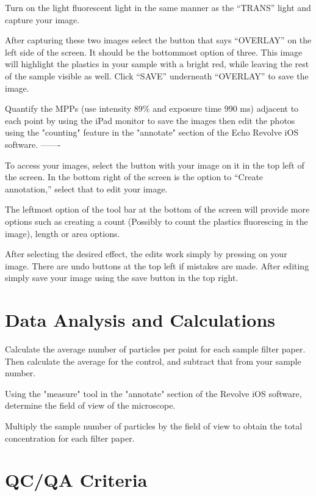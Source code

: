 \documentclass[12pt]{../SOP4_alpha}\usepackage[]{graphicx}\usepackage[]{color}
\begin{document}
\NP Turn on the light fluorescent light in the same manner as the ``TRANS'' light and capture your image. 

\NP After capturing these two images select the button that says ``OVERLAY'' on the left side of the screen. It should be the bottommost option of three. This image will highlight the plastics in your sample with a bright red, while leaving the rest of the sample visible as well. Click ``SAVE'' underneath ``OVERLAY'' to save the image.

\NP Quantify the MPPs (use intensity 89\% and exposure time 990 ms) adjacent to each point by using the iPad monitor to save the images then edit the photos using the "counting" feature in the "annotate" section of the Echo Revolve iOS software. -------

\NP To access your images, select the button with your image on it in the top left of the screen. In the bottom right of the screen is the option to ``Create annotation,'' select that to edit your image. 

\NP The leftmost option of the tool bar at the bottom of the screen will provide more options such as creating a count (Possibly to count the plastics fluorescing in the image), length or area options. 

\NP After selecting the desired effect, the edits work  simply by pressing on your image. There are undo buttons at the top left if mistakes are made. After editing simply save your image using the save button in the top right.

\section{Data Analysis and Calculations}

  \NP Calculate the average number of particles per point for each sample filter paper. Then calculate the average for the control, and subtract that from your sample number.

  \NP Using the "measure" tool in the "annotate" section of the Revolve iOS software, determine the field of view of the microscope.

  \NP Multiply the sample number of particles by the field of view to obtain the total concentration for each filter paper.
  


\section{QC/QA Criteria}
\end{document}
